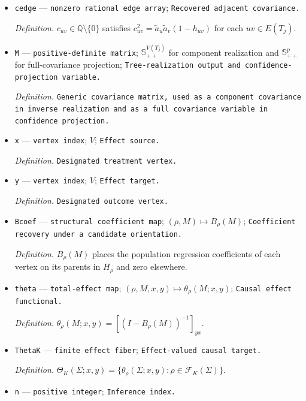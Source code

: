 \documentclass{article}
\begin{document}
\begin{itemize}
  \par\smallskip\noindent\emph{Definition.} \(h_{uv}=1-\Sigma_{uv}^{2}/(\Sigma_{uu}\Sigma_{vv})\) on a realized tree.
  \item \texttt{cedge} --- \texttt{nonzero rational edge array}; \texttt{Recovered adjacent covariance.}
  \par\smallskip\noindent\emph{Definition.} \(c_{uv}\in\mathbb Q\setminus\{0\}\) satisfies \(c_{uv}^{2}=\widetilde a_u\widetilde a_v(1-h_{uv})\) for each \(uv\in E(T_j)\).
  \item \texttt{M} --- \texttt{positive-\allowbreak{}definite matrix}; \(\mathbb S_{++}^{V(T_j)}\) for component realization and \(\mathbb S_{++}^{p}\) for full-covariance projection; \texttt{Tree-\allowbreak{}realization output and confidence-\allowbreak{}projection variable.}
  \par\smallskip\noindent\emph{Definition.} \texttt{Generic covariance matrix,\allowbreak{} used as a component covariance in inverse realization and as a full covariance variable in confidence projection.}
  \item \texttt{x} --- \texttt{vertex index}; \(V\); \texttt{Effect source.}
  \par\smallskip\noindent\emph{Definition.} \texttt{Designated treatment vertex.}
  \item \texttt{y} --- \texttt{vertex index}; \(V\); \texttt{Effect target.}
  \par\smallskip\noindent\emph{Definition.} \texttt{Designated outcome vertex.}
  \item \texttt{Bcoef} --- \texttt{structural coefficient map}; \((\rho,M)\mapsto B_\rho(M)\); \texttt{Coefficient recovery under a candidate orientation.}
  \par\smallskip\noindent\emph{Definition.} \(B_\rho(M)\) places the population regression coefficients of each vertex on its parents in \(H_\rho\) and zero elsewhere.
  \item \texttt{theta} --- \texttt{total-\allowbreak{}effect map}; \((\rho,M,x,y)\mapsto\theta_\rho(M;x,y)\); \texttt{Causal effect functional.}
  \par\smallskip\noindent\emph{Definition.} \(\theta_\rho(M;x,y)=[(I-B_\rho(M))^{-1}]_{yx}\).
  \item \texttt{ThetaK} --- \texttt{finite effect fiber}; \texttt{Effect-\allowbreak{}valued causal target.}
  \par\smallskip\noindent\emph{Definition.} \(\Theta_K(\Sigma;x,y)=\{\theta_\rho(\Sigma;x,y):\rho\in\mathcal F_K(\Sigma)\}\).
  \item \texttt{n} --- \texttt{positive integer}; \texttt{Inference index.}

\end{itemize}
\end{document}
